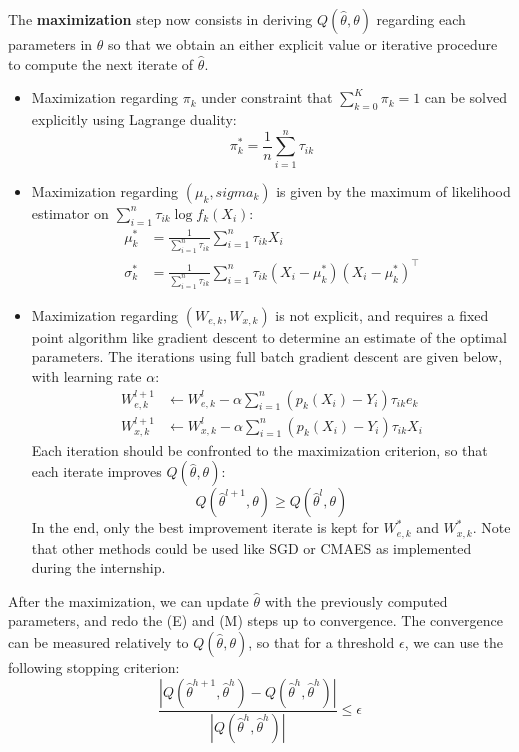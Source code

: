 The \textbf{maximization} step now consists in deriving $Q(\widehat{\theta}, \theta)$ regarding each parameters in $\theta$
so that we obtain an either explicit value or iterative procedure to compute the next iterate of $\widehat{\theta}$.
\begin{itemize}
    \item Maximization regarding $\pi_k$ under constraint that $\sum_{k=0}^K \pi_k = 1$ can be solved explicitly using Lagrange duality:
    $$
    \pi_k^* = \frac{1}{n} \sum_{i=1}^n \tau_{ik}
    $$
    \item Maximization regarding $(\mu_k, sigma_k)$ is given by the maximum of likelihood estimator on $\sum_{i=1}^n \tau_{ik} \log f_{k}(X_i)$:
    $$
    \begin{align}
        \mu_k^* &= \frac{1}{\sum_{i=1}^n \tau_{ik}} \sum_{i=1}^n \tau_{ik} X_i \\
        \sigma_k^* &= \frac{1}{\sum_{i=1}^n \tau_{ik}} \sum_{i=1}^n \tau_{ik} (X_i - \mu_k^*)(X_i - \mu_k^*)^\top
    \end{align}
    $$
    \item Maximization regarding $(W_{e,k}, W_{x,k})$ is not explicit, and requires a fixed point algorithm like gradient descent to determine an estimate of the optimal parameters.
    The iterations using full batch gradient descent are given below, with learning rate $\alpha$:
    $$
    \begin{align}
        W_{e,k}^{l+1} &\leftarrow W_{e,k}^{l} - \alpha \sum_{i=1}^n (p_k(X_i) - Y_i) \tau_{ik} e_k \\
        W_{x,k}^{l+1} &\leftarrow  W_{x,k}^{l} - \alpha \sum_{i=1}^n (p_k(X_i) - Y_i) \tau_{ik} X_i
    \end{align}
    $$
    Each iteration should be confronted to the maximization criterion, so that each iterate improves $Q(\widehat{\theta}, \theta)$:
    $$
    Q(\widehat{\theta}^{l+1}, \theta) \geq Q(\widehat{\theta}^{l}, \theta)
    $$
    In the end, only the best improvement iterate is kept for $W_{e,k}^*$ and $W_{x,k}^*$. Note that other methods could be used like SGD or CMAES as implemented during the internship.
\end{itemize}

After the maximization, we can update $\widehat{\theta}$ with the previously computed parameters, and redo the (E) and (M) steps up to convergence.
The convergence can be measured relatively to $ Q(\widehat{\theta}, \theta)$, so that for a threshold $\epsilon$, we can use the following stopping criterion:
$$
\frac{|Q(\widehat{\theta}^{h+1}, \widehat{\theta}^{h}) - Q(\widehat{\theta}^{h}, \widehat{\theta}^{h})|}{|Q(\widehat{\theta}^{h}, \widehat{\theta}^{h})|} \leq \epsilon
$$

